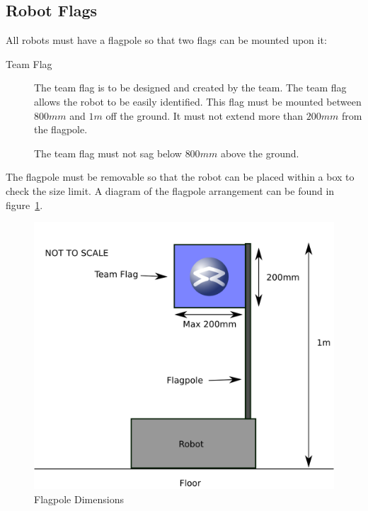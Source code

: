 \subsection{Robot Flags}
\label{sec:flags}
All robots must have a flagpole so that two flags can be mounted upon it:
\begin{description}
\item[Team Flag] The team flag is to be designed and created by the team.
 The team flag allows the robot to be easily identified.
 This flag must be mounted between $800mm$ and $1m$ off the ground.
 It must not extend more than $200mm$ from the flagpole.

The team flag must not sag below $800mm$ above the ground.
\end{description}

The flagpole must be removable so that the robot can be placed within a box to check the size limit.
A diagram of the flagpole arrangement can be found in figure~\ref{fig:flag}.

\begin{figure}
\begin{center}
\includegraphics[keepaspectratio, scale =1]{./images/flag.png}
\caption{\label{fig:flag}Flagpole Dimensions}
\end{center}
\end{figure}
\clearpage
